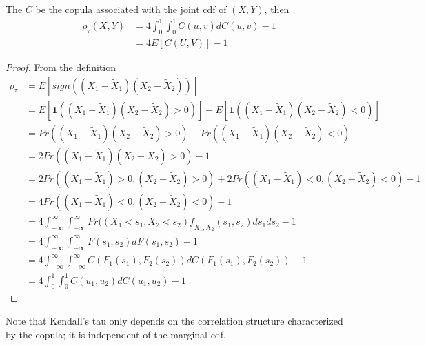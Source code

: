 \begin{refsection}
\begin{lemma}\cite[207]{mcneil2015quantitative}\label{ch:statistical-models:KendallTauFromCopula}
The $C$ be the copula associated with the joint cdf of $(X,Y)$, then 
\begin{align*}
\rho_{\tau}(X,Y) & = 4\int_0^1\int_0^1 C(u,v)dC(u,v) - 1 \\
&=4E[C(U,V)] - 1
\end{align*}
\end{lemma}
\begin{proof}
From the definition 
\begin{align*}
\rho_\tau &= E[sign((X_1-\tilde{X}_1)(X_2 - \tilde{X}_2))] \\
& =E[\bm{1}((X_1-\tilde{X}_1)(X_2 - \tilde{X}_2)>0)]-E[\bm{1}((X_1-\tilde{X}_1)(X_2 - \tilde{X}_2)<0)] \\
&=Pr((X_1-\tilde{X}_1)(X_2 - \tilde{X}_2)>0)-Pr((X_1-\tilde{X}_1)(X_2 - \tilde{X}_2)<0) \\
&=2Pr((X_1-\tilde{X}_1)(X_2 - \tilde{X}_2)>0) - 1\\
&=2Pr((X_1-\tilde{X}_1)>0,(X_2 - \tilde{X}_2)>0) + 2Pr((X_1-\tilde{X}_1)<0,(X_2 - \tilde{X}_2)<0)- 1 \\
&=4Pr((X_1-\tilde{X}_1)<0,(X_2 - \tilde{X}_2)<0) - 1 \\
&=4\int_{-\infty}^{\infty}\int_{-\infty}^{\infty}Pr((X_1<s_1,X_2 <s_2)f_{\tilde{X}_1,\tilde{X}_2}(s_1,s_2)ds_1ds_2 - 1 \\
&=4\int_{-\infty}^{\infty}\int_{-\infty}^{\infty}F(s_1,s_2)dF(s_1,s_2) - 1 \\
&=4\int_{-\infty}^{\infty}\int_{-\infty}^{\infty}C(F_1(s_1),F_2(s_2))dC(F_1(s_1),F_2(s_2)) - 1 \\
&=4\int_{0}^{1}\int_{0}^{1}C(u_1,u_2)dC(u_1,u_2) - 1
\end{align*}

\end{proof}

\begin{remark}
Note that Kendall's tau only depends on the correlation structure characterized by the copula; it is independent of the marginal cdf.	
\end{remark}



\end{refsection}
